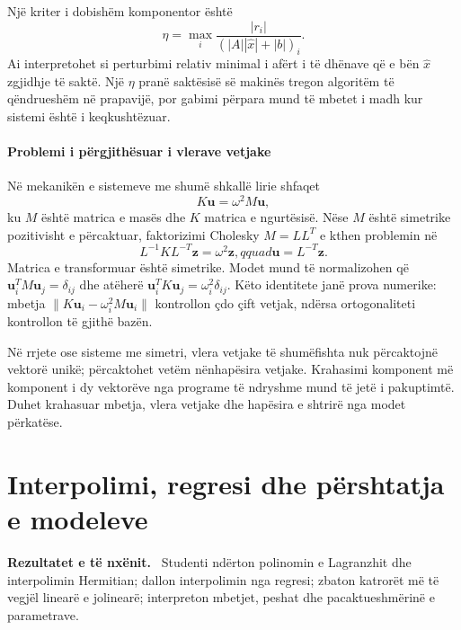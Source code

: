 \documentclass[11pt,oneside,openany]{book}
\newcommand{\vect}[1]{\bm{#1}}
\newenvironment{qellime}{\par\medskip\noindent\textbf{Rezultatet e të nxënit.}\ }{\par\medskip}
\begin{document}
Një kriter i dobishëm komponentor është
\begin{equation}
 \eta=\max_i\frac{|r_i|}{(|A||\widehat x|+|b|)_i}.
\end{equation}
Ai interpretohet si perturbimi relativ minimal i afërt i të dhënave që e bën $\widehat x$ zgjidhje të saktë. Një $\eta$ pranë saktësisë së makinës tregon algoritëm të qëndrueshëm në prapavijë, por gabimi përpara mund të mbetet i madh kur sistemi është i keqkushtëzuar.

\subsubsection{Problemi i përgjithësuar i vlerave vetjake}
Në mekanikën e sistemeve me shumë shkallë lirie shfaqet
\begin{equation}
 K\vect u=\omega^2M\vect u,
\end{equation}
ku $M$ është matrica e masës dhe $K$ matrica e ngurtësisë. Nëse $M$ është simetrike pozitivisht e përcaktuar, faktorizimi Cholesky $M=LL^T$ e kthen problemin në
\begin{equation}
 L^{-1}KL^{-T}\vect z=\omega^2\vect z,qquad \vect u=L^{-T}\vect z.
\end{equation}
Matrica e transformuar është simetrike. Modet mund të normalizohen që $\vect u_i^TM\vect u_j=\delta_{ij}$ dhe atëherë $\vect u_i^TK\vect u_j=\omega_i^2\delta_{ij}$. Këto identitete janë prova numerike: mbetja $\|K\vect u_i-\omega_i^2M\vect u_i\|$ kontrollon çdo çift vetjak, ndërsa ortogonaliteti kontrollon të gjithë bazën.

Në rrjete ose sisteme me simetri, vlera vetjake të shumëfishta nuk përcaktojnë vektorë unikë; përcaktohet vetëm nënhapësira vetjake. Krahasimi komponent më komponent i dy vektorëve nga programe të ndryshme mund të jetë i pakuptimtë. Duhet krahasuar mbetja, vlera vetjake dhe hapësira e shtrirë nga modet përkatëse.





\chapter{Interpolimi, regresi dhe përshtatja e modeleve}
\begin{qellime}
Studenti ndërton polinomin e Lagranzhit dhe interpolimin Hermitian; dallon interpolimin nga regresi; zbaton katrorët më të vegjël linearë e jolinearë; interpreton mbetjet, peshat dhe pacaktueshmërinë e parametrave.
\end{qellime}
\end{document}
